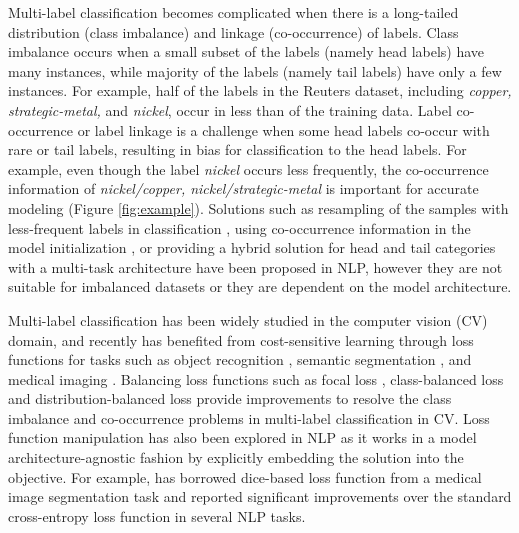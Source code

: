 \documentclass[11pt]{article}
\begin{document}
Multi-label classification becomes complicated when there is a long-tailed distribution (class imbalance) and linkage (co-occurrence) of labels. Class imbalance occurs when a small subset of the labels (namely head labels) have many instances, while majority of the labels (namely tail labels) have only a few instances. For example, half of the labels in the Reuters dataset, including \textit{copper, strategic-metal,} and \textit{nickel}, occur in less than  of the training data. Label co-occurrence or label linkage is a challenge when some head labels co-occur with rare or tail labels, resulting in bias for classification to the head labels. For example, even though the label \textit{nickel} occurs less frequently, the co-occurrence information of \textit{nickel/copper, nickel/strategic-metal} is important for accurate modeling (Figure \ref{fig:example}). Solutions such as resampling of the samples with less-frequent labels in classification \citep{resampling_general_example, resampling_multilabel_example}, using co-occurrence information in the model initialization  \citep{kurata2016improved}, or providing a hybrid solution for head and tail categories with a multi-task architecture \citep{hscnn} have been proposed in NLP, however they are not suitable for imbalanced datasets or they are dependent on the model architecture. 

Multi-label classification has been widely studied in the computer vision (CV) domain, and recently has benefited from cost-sensitive learning through loss functions for tasks such as object recognition \citep{BCE_CV,Dice-Loss-CV}, semantic segmentation \citep{Ge_2018_CVPR}, and medical imaging  \citep{li_multi-label_2020}. Balancing loss functions such as focal loss \citep{lin2017focal}, class-balanced loss \citep{class-balanced-loss} and distribution-balanced loss \citep{DBLoss} provide improvements to resolve the class imbalance and co-occurrence problems in multi-label classification in CV.
Loss function manipulation 
has also been explored   \citep{li-etal-2020-dice, SPECTER} in NLP as it works in a model architecture-agnostic fashion by explicitly embedding the solution into the objective. For example,  \citet{li-etal-2020-dice} has borrowed dice-based loss function from a medical image segmentation task \citep{Dice-Loss-CV} and reported significant improvements over the standard cross-entropy loss function in several NLP tasks. 
\end{document}

